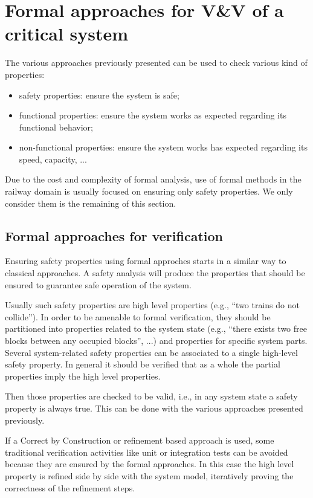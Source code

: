 
\section{Formal approaches for V\&V of a critical system}

The various approaches previously presented can be used to check
various kind of properties:
\begin{itemize}
\item safety properties: ensure the system is safe;
\item functional properties: ensure the system works as expected
  regarding its functional behavior;
\item non-functional properties: ensure the system works has expected
  regarding its speed, capacity, ...
\end{itemize}

Due to the cost and complexity of formal analysis, use of formal
methods in the railway domain is usually focused on ensuring only
safety properties. We only consider them is the remaining of this
section.


\subsection{Formal approaches for verification}

Ensuring safety properties using formal approches starts in a similar
way to classical approaches. A safety analysis will produce the
properties that should be ensured to guarantee safe operation of the
system.

Usually such safety properties are high level properties (e.g., ``two
trains do not collide''). In order to be amenable to formal verification,
they should be partitioned into properties related to the system state
(e.g., ``there exists two free blocks between any occupied blocks'', ...)
and properties for specific system parts. Several system-related safety
properties can be associated to a single high-level safety property. In
general it should be verified that as a whole the partial properties
imply the high level properties.

Then those properties are checked to be valid, i.e., in any system
state a safety property is always true. This can be done with the
various approaches presented previously.

If a Correct by Construction or refinement based approach is used, some
traditional verification activities like unit or integration tests can be
avoided because they are ensured by the formal approaches. In this case
the high level property is refined side by side with the system model,
iteratively proving the correctness of the refinement steps.

